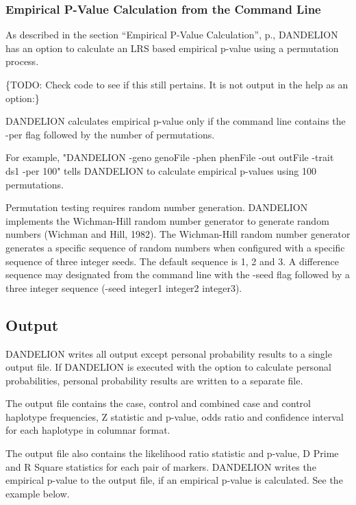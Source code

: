 \subsubsection{Empirical P-Value Calculation from the Command Line}
\label{subsec:p_val_cmd_line}
As described in the section ``Empirical P-Value Calculation'',
p.\pageref{subsec:emp_p_val}, DANDELION has an option to calculate an LRS based
empirical p-value using a permutation process.

\{TODO: Check code to see if this still pertains.  It is not output in the help
as an option:\} 

DANDELION calculates empirical p-value only if the command line
contains the -per flag followed by the number of permutations.

For example, "DANDELION -geno genoFile -phen phenFile -out outFile -trait ds1
-per 100" tells DANDELION to calculate empirical p-values using 100
permutations.

Permutation testing requires random number generation.  DANDELION implements the
Wichman-Hill random number generator to generate random numbers (Wichman and
Hill, 1982).  The Wichman-Hill random number generator generates a specific
sequence of random numbers when configured with a specific sequence of three
integer seeds.  The default sequence is 1, 2 and 3.  A difference sequence may
designated from the command line with the -seed flag followed by a three integer
sequence (-seed integer1 integer2 integer3).

\subsection{Output}

DANDELION writes all output except personal probability results to a single
output file.  If DANDELION is executed with the option to calculate personal
probabilities, personal probability results are written to a separate file.

The output file contains the case, control and combined case and control haplotype frequencies, Z statistic and p-value, odds ratio and confidence interval for each haplotype in columnar format.

The output file also contains the likelihood ratio statistic and p-value, D
Prime and R Square statistics for each pair of markers.  DANDELION writes the
empirical p-value to the output file, if an empirical p-value is calculated.
See the example below.

